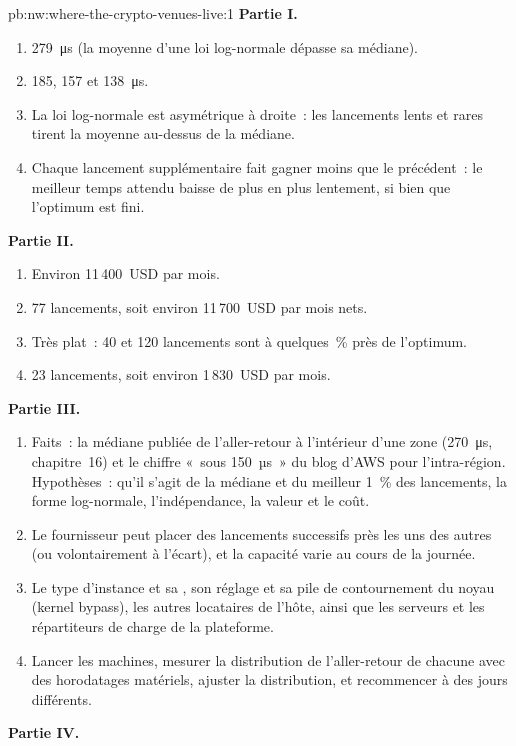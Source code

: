 \begin{solution}{pb:nw:where-the-crypto-venues-live:1}
\textbf{Partie I.}
\begin{enumerate}
\item \qty{279}{\micro\second} (la moyenne d'une loi log-normale dépasse sa médiane).
\item 185, 157 et \qty{138}{\micro\second}.
\item La loi log-normale est asymétrique à droite~: les lancements lents et rares tirent la moyenne au-dessus de la médiane.
\item Chaque lancement supplémentaire fait gagner moins que le précédent~: le meilleur temps attendu baisse de plus en plus lentement, si bien que l'optimum est fini.
\end{enumerate}
\textbf{Partie II.}
\begin{enumerate}[resume]
\item Environ 11\,400~USD par mois.
\item 77 lancements, soit environ 11\,700~USD par mois nets.
\item Très plat~: 40 et 120 lancements sont à quelques~\% près de l'optimum.
\item 23 lancements, soit environ 1\,830~USD par mois.
\end{enumerate}
\textbf{Partie III.}
\begin{enumerate}[resume]
\item Faits~: la médiane publiée de l'aller-retour à l'intérieur d'une zone (\qty{270}{\micro\second}, chapitre~16) et le chiffre «~sous 150~µs~» du blog d'AWS pour l'intra-région.
  Hypothèses~: qu'il s'agit de la médiane et du meilleur 1~\% des lancements, la forme log-normale, l'indépendance, la valeur et le coût.
\item Le fournisseur peut placer des lancements successifs près les uns des autres (ou volontairement à l'écart), et la capacité varie au cours de la journée.
\item Le type d'instance et sa , son réglage et sa pile de contournement du noyau (kernel bypass), les autres locataires de l'hôte, ainsi que les serveurs et les
  répartiteurs de charge de la plateforme.
\item Lancer les machines, mesurer la distribution de l'aller-retour de chacune avec des horodatages matériels, ajuster la distribution, et recommencer à des jours différents.
\end{enumerate}
\textbf{Partie IV.}
\begin{enumerate}[resume]

\end{enumerate}
\end{solution}
